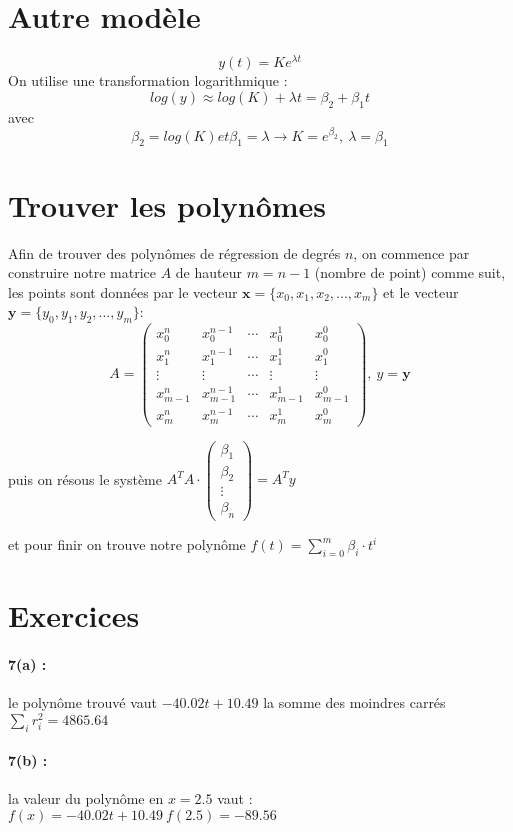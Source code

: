\documentclass[11pt,a4paper]{report}
\begin{document}
\section{Autre modèle}
$$y(t) = Ke^{\lambda t}$$
On utilise une transformation logarithmique :
$$
log(y) \approx log(K) + \lambda t = \beta_2 + \beta_1 t
$$
avec
$$
\beta_2 = log(K) et \beta_1 = \lambda \longrightarrow K = e^{\beta_2}, \ \lambda = \beta_1
$$

\section{Trouver les polynômes}

Afin de trouver des polynômes de régression de degrés $n$, on commence par construire notre matrice $A$ de hauteur $m=n-1$ (nombre de point) comme suit, les points sont données par le vecteur $\textbf{x} = \{x_0,x_1,x_2,...,x_m\}$ et le vecteur $\textbf{y}=\{y_0,y_1,y_2,...,y_m\}$:
$$A = 
\begin{pmatrix}
x_0^n & x_0^{n-1} & \cdots & x_0^1 & x_0^0 \\
x_1^n & x_1^{n-1} & \cdots & x_1^1 & x_1^0 \\
\vdots & \vdots & \cdots & \vdots & \vdots \\
x_{m-1}^n & x_{m-1}^{n-1} & \cdots & x_{m-1}^1 & x_{m-1}^0 \\
x_m^n & x_m^{n-1} & \cdots & x_m^1 & x_m^0
\end{pmatrix}
,\
y = \textbf{y}
$$

puis on résous le système $A^T A \cdot \begin{pmatrix}\beta_1 \\ \beta_2 \\ \vdots \\ \beta_n\end{pmatrix} = A^Ty$

et pour finir on trouve notre polynôme $f(t)=\sum_{i=0}^m \beta_i \cdot t^i$


\section{Exercices}

\paragraph*{7(a) : } le polynôme trouvé vaut $-40.02t+10.49$ la somme des moindres carrés $\sum_ir^2_i = 4865.64$

\paragraph*{7(b) : } la valeur du polynôme en $x=2.5$ vaut : $f(x)=-40.02t+10.49 \ f(2.5)=-89.56$
\end{document}
